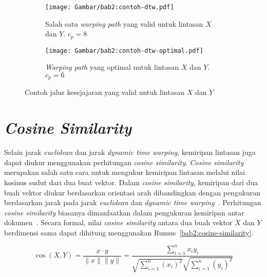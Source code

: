 \begin{figure}[h]
    \centering
    \begin{subfigure}{0.25\textwidth}
        \centering
        \texttt{[image: Gambar/bab2:contoh-dtw.pdf]}
        \caption{Salah satu \textit{warping path} yang valid untuk lintasan $X$ dan $Y$. $c_p = 8$}
        \label{bab2:warping-path}
    \end{subfigure} \hspace{1cm}
    \begin{subfigure}{0.25\textwidth}
        \centering
        \texttt{[image: Gambar/bab2:contoh-dtw-optimal.pdf]}
        \caption{\textit{Warping path} yang optimal untuk lintasan $X$ dan $Y$. $c_p = 6$}
        \label{bab2:warping-path-optimal}
    \end{subfigure}
    \caption{Contoh jalur kesejajaran yang valid untuk lintasan $X$ dan $Y$}
    \label{bab2:contoh-dtw}
\end{figure}

\iffalse 

\lionov{harus ditambah contoh perhitungan}

\fi

\section{\textit{Cosine Similarity}}

Selain jarak \textit{euclidean} dan jarak \textit{dynamic time warping}, kemiripan lintasan juga dapat diukur menggunakan perhitungan \textit{cosine similarity}. \textit{Cosine similarity} merupakan salah satu cara untuk mengukur kemiripan lintasan melalui nilai kosinus sudut dari dua buat vektor. Dalam \textit{cosine similarity}, kemiripan dari dua buah vektor diukur berdasarkan orientasi arah dibandingkan dengan pengukuran berdasarkan jarak pada jarak \textit{euclidean} dan \textit{dynamic time warping}~\cite{sitikhu:cosine-similarity}. Perhitungan \textit{cosine similarity} biasanya dimanfaatkan dalam pengukuran kemiripan antar dokumen~\cite{sitikhu:cosine-similarity}. Secara formal, nilai \textit{cosine similarity} antara dua buah vektor $X$ dan $Y$ berdimensi sama dapat dihitung menggunakan Rumus~\ref{bab2:cosine-similarity}.

\begin{equation}
    \cos (X, Y)= \frac{x \cdot y}{\|x\| \|y\|} = \frac{ \sum_{i=1}^{n}{x_i y_i}}{ \sqrt{\sum_{i=1}^{n}{(x_i)^2}} \sqrt{\sum_{i=1}^{n}{( y_i)^2}} }
    \label{bab2:cosine-similarity}
\end{equation}

